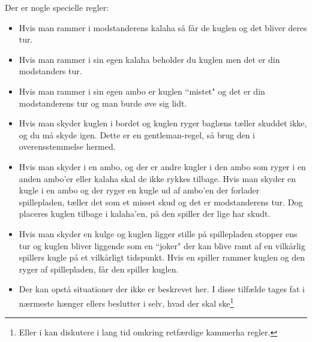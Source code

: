 Der er nogle specielle regler: 
\begin{itemize}
	\item Hvis man rammer i modstanderens kalaha så får de kuglen og det bliver deres tur. 
	\item Hvis man rammer i sin egen kalaha beholder du kuglen men det er din modstanders tur. 
	\item Hvis man rammer i sin egen ambo er kuglen ``mistet" og det er din modstanderens tur og man burde øve sig lidt.
	\item Hvis man skyder kuglen i bordet og kuglen ryger baglæns tæller skuddet ikke, og du må skyde igen. Dette er en gentleman-regel, så brug den i overensstemmelse  hermed.
	\item Hvis man skyder i en ambo, og der er andre kugler i den ambo som ryger i en anden ambo'er eller kalaha skal de ikke rykkes tilbage. Hvis man skyder en kugle i en ambo og der ryger en kugle ud af ambo'en der forlader spillepladen, tæller det som et misset skud og det er modstanderens tur. Dog placeres kuglen tilbage i kalaha'en, på den spiller der lige har skudt.
	\item Hvis man skyder en kulge og kuglen ligger stille på spillepladen stopper ens tur og kuglen bliver liggende som en ``joker" der kan blive ramt af en vilkårlig spillers kugle på et vilkårligt tidspunkt. Hvis en spiller rammer kuglen og den ryger af spillepladen, får den spiller kuglen.
	\item Der kan opstå situationer der ikke er beskrevet her. I disse tilfælde tages fat i nærmeste hænger ellers beslutter i selv, hvad der skal ske\footnote{Eller i kan diskutere i lang tid omkring retfærdige kammerha regler.}
\end{itemize}

